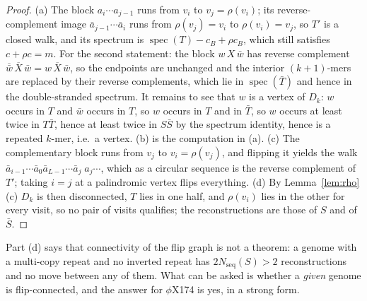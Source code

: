\documentclass[11pt]{article}
\theoremstyle{plain}
\theoremstyle{definition}
\theoremstyle{remark}
\newcommand{\spec}{\operatorname{spec}}
\newcommand{\Nseq}{N_{\mathrm{seq}}}
\begin{document}
\begin{proof}
(a) The block $a_i\cdots a_{j-1}$ runs from $v_i$ to $v_j=\rho(v_i)$; its reverse-complement
image $\bar a_{j-1}\cdots\bar a_i$ runs from $\rho(v_j)=v_i$ to $\rho(v_i)=v_j$, so $T'$ is a
closed walk, and its spectrum is $\spec(T)-c_B+\rho c_B$, which still satisfies $c+\rho c=m$.
For the second statement: the block $w\,X\,\bar w$ has reverse complement
$\overline{\bar w}\,\overline X\,\bar w=w\,\overline X\,\bar w$, so the endpoints are
unchanged and the interior $(k{+}1)$-mers are replaced by their reverse complements, which
lie in $\spec(\bar T)$ and hence in the double-stranded spectrum. It remains to see that $w$
is a vertex of $D_k$: $w$ occurs in $T$ and $\bar w$ occurs in $T$, so $w$ occurs in $T$ and
in $\bar T$, so $w$ occurs at least twice in $T\bar T$, hence at least twice in $S\bar S$ by
the spectrum identity, hence is a repeated $k$-mer, i.e.\ a vertex. (b) is the computation in
(a). (c) The complementary block runs from $v_j$ to $v_i=\rho(v_j)$, and flipping it yields
the walk $\bar a_{i-1}\cdots\bar a_{0}\bar a_{L-1}\cdots\bar a_{j}\;a_j\cdots$, which as a
circular sequence is the reverse complement of $T'$; taking $i=j$ at a palindromic vertex
flips everything. (d) By Lemma~\ref{lem:rho}(c) $D_k$ is then disconnected, $T$ lies in one
half, and $\rho(v_i)$ lies in the other for every visit, so no pair of visits qualifies; the
reconstructions are those of $S$ and of $\bar S$.
\end{proof}

Part (d) says that connectivity of the flip graph is not a theorem: a genome with a
multi-copy repeat and no inverted repeat has $2\Nseq(S)>2$ reconstructions and no move between
any of them. What can be asked is whether a \emph{given} genome is flip-connected, and the
answer for $\phi$X174 is yes, in a strong form.
\end{document}
